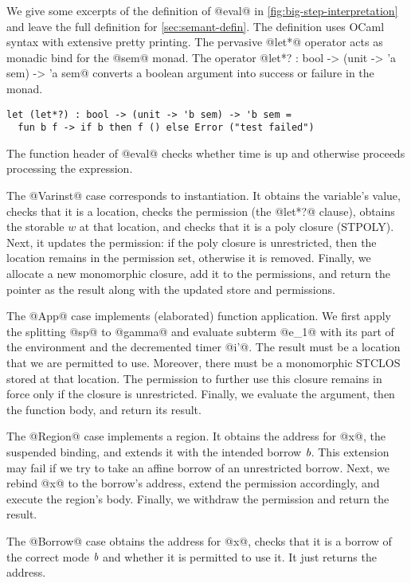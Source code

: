 We give some excerpts of the definition of @eval@ in
\cref{fig:big-step-interpretation} and leave the full
definition for \cref{sec:semant-defin}.
The definition uses OCaml syntax with extensive pretty
printing. The pervasive @let*@ operator acts as monadic bind
for the @sem@ monad. The operator
@let*? : bool -> (unit -> 'a sem) -> 'a sem@
 converts a boolean
argument into success or failure in the monad.
\begin{lstlisting}
let (let*?) : bool -> (unit -> 'b sem) -> 'b sem =
  fun b f -> if b then f () else Error ("test failed")
\end{lstlisting}
The function header of @eval@ checks
whether time is up and otherwise proceeds processing the expression.

The @Varinst@ case corresponds to instantiation. It
obtains the variable's value, checks that it is a location, checks the
permission (the @let*?@ clause), obtains the storable $w$ at that
location, and checks that it is a poly closure (STPOLY). Next, it updates the
permission: if the poly closure is unrestricted, then the location
remains in the permission set, otherwise it is removed. Finally, we
allocate a new monomorphic closure, add it to the permissions, and
return the pointer as the result along with the updated store and
permissions.

The @App@ case implements (elaborated) function application.
We first apply the splitting @sp@ to @gamma@ and
evaluate subterm @e_1@ with its part of the environment and the
decremented timer @i'@. The result must be a location that we are
permitted to use. Moreover, there must be a monomorphic STCLOS stored
at that location. The permission to further use this closure  remains
in force only if the closure is unrestricted. Finally, we evaluate the
argument, then the function body, and return its result.



The @Region@ case implements a region. It obtains the address for @x@,
the suspended binding, and extends it with the intended borrow
$\textit{b}$. This extension may fail if we try to take an affine borrow
of an unrestricted borrow. Next, we rebind @x@ to the borrow's
address, extend the permission accordingly, and execute the region's
body.  Finally, we withdraw the permission and return the result.

The @Borrow@ case obtains the address for @x@, checks that it is a
borrow of the correct mode $\textit{b}$ and whether it is permitted to
use it. It just returns the address.

\lstDeleteShortInline@

